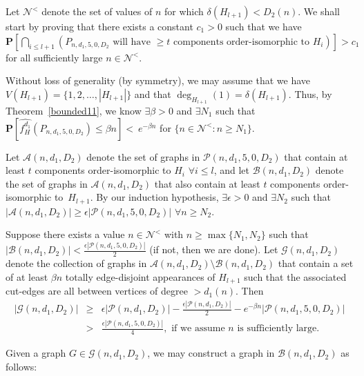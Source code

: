 \documentclass{article}
\newtheorem{Proof of Theorem}{Proof of Theorem}
\begin{document}
Let $\mathcal{N}^{<}$ denote the set of values of $n$ for which $\delta(H_{l+1})<D_{2}(n)$.
We shall start by proving that there exists a constant $c_{1}>0$ such that we have
$\mathbf{P}\left[ \bigcap_{i \leq l+1} \left(P_{n,d_{1},5,0,D_{2}} 
\textrm{ will have $\geq t$ components order-isomorphic to $H_{i}$} \right) \right] > c_{1}$
for all sufficiently large $n \in \mathcal{N}^{<}$.

Without loss of generality (by symmetry),
we may assume that we have
$V(H_{l+1}) = \{ 1,2, \ldots, |H_{l+1}| \}$
and that $\deg_{H_{l+1}}(1) = \delta (H_{l+1})$.
Thus, by Theorem~\ref{bounded11}, we know
$\exists \beta >0$ and $\exists N_{1}$ such that
$\mathbf{P}[\widehat{f_{H}^{d_{1}}}(P_{n,d_{1},5,0,D_{2}}) 
\leq \beta n] <~\!e^{- \beta n}$ for $\{ n \in \mathcal{N}^{<}:n \geq N_{1} \}$.

Let $\mathcal{A}(n,d_{1},D_{2})$ 
denote the set of graphs in 
$\mathcal{P}(n,d_{1},5,0,D_{2})$ 
that contain at least $t$ components order-isomorphic to $H_{i}$ $\forall i \leq l$,
and let $\mathcal{B}(n,d_{1},D_{2})$
denote the set of graphs in $\mathcal{A}(n,d_{1},D_{2})$ 
that also contain at least $t$ components order-isomorphic to~$H_{l+1}$.
By our induction hypothesis,
$\exists \epsilon >0$ and $\exists N_{2}$ such that
$|\mathcal{A}(n,d_{1},D_{2})| \geq \epsilon |\mathcal{P}(n,d_{1},5,0,D_{2})|$ $\forall n \geq N_{2}$.

Suppose there exists a value $n \in \mathcal{N}^{<}$ with $n \geq \max \{ N_{1},N_{2} \}$
such that 
$|\mathcal{B}(n,d_{1},D_{2})| < \frac{\epsilon |\mathcal{P}(n,d_{1},5,0,D_{2})|}{2}$
(if not, then we are done).
Let $\mathcal{G}(n,d_{1},D_{2})$ denote the collection of graphs in
$\mathcal{A}(n,d_{1},D_{2}) \setminus \mathcal{B}(n,d_{1},D_{2})$
that contain a set of at least $\beta n$ totally edge-disjoint appearances of $H_{l+1}$
such that the associated cut-edges are all between vertices of degree $>d_{1}(n)$.
Then
\begin{eqnarray*}
|\mathcal{G}(n,d_{1},D_{2})| 
& \geq & \epsilon |\mathcal{P}(n,d_{1},D_{2})| - \frac{ \epsilon |\mathcal{P}(n,d_{1},D_{2})| }{2}
- e^{- \beta n} |\mathcal{P}(n,d_{1},5,0,D_{2})| \\
& > & \frac{\epsilon |\mathcal{P}(n,d_{1},5,0,D_{2})|}{4},
\textrm{ if we assume $n$ is sufficiently large.} 
\end{eqnarray*}

Given a graph $G \in \mathcal{G}(n,d_{1},D_{2})$,
we may construct a graph in $\mathcal{B}(n,d_{1},D_{2})$ as follows: 
\end{document}
